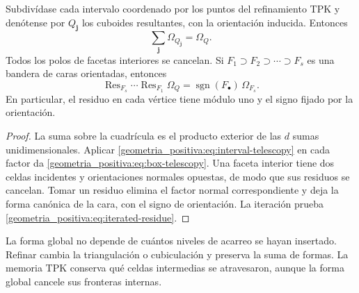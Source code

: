 \begin{theorem}
\label{geometria_positiva:thm:tpk-higher-residues}
Subdivídase cada intervalo coordenado por los puntos del refinamiento TPK y
denótense por \(Q_{\mathbf j}\) los cuboides resultantes, con la orientación
inducida. Entonces
\begin{equation}
 \boxed{\displaystyle
 \sum_{\mathbf j}\Omega_{Q_{\mathbf j}}=\Omega_Q.}
 \label{geometria_positiva:eq:box-telescopy}
\end{equation}
Todos los polos de facetas interiores se cancelan. Si
\(F_1\supset F_2\supset\cdots\supset F_s\) es una bandera de caras orientadas,
entonces
\begin{equation}
 \operatorname{Res}_{F_s}\cdots\operatorname{Res}_{F_1}\Omega_Q
 =\operatorname{sgn}(F_\bullet)\,\Omega_{F_s}.
 \label{geometria_positiva:eq:iterated-residue}
\end{equation}
En particular, el residuo en cada vértice tiene módulo uno y el signo fijado
por la orientación.
\end{theorem}
\begin{proof}
La suma sobre la cuadrícula es el producto exterior de las \(d\) sumas
unidimensionales. Aplicar \eqref{geometria_positiva:eq:interval-telescopy} en cada factor da
\eqref{geometria_positiva:eq:box-telescopy}. Una faceta interior tiene dos celdas incidentes y
orientaciones normales opuestas, de modo que sus residuos se cancelan. Tomar
un residuo elimina el factor normal correspondiente y deja la forma canónica
de la cara, con el signo de orientación. La iteración prueba
\eqref{geometria_positiva:eq:iterated-residue}.
\end{proof}

\begin{corollary}
La forma global no depende de cuántos niveles de acarreo se hayan insertado.
Refinar cambia la triangulación o cubiculación y preserva la suma de formas.
La memoria TPK conserva qué celdas intermedias se atravesaron, aunque la forma
global cancele sus fronteras internas.
\end{corollary}

